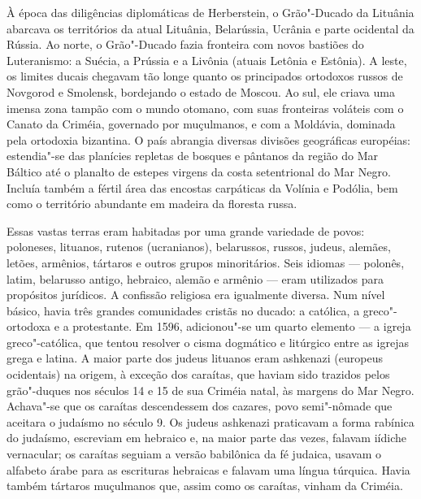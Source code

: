 À época das diligências diplomáticas de Herberstein, o Grão"-Ducado da
Lituânia abarcava os territórios da atual Lituânia, Belarússia, Ucrânia
e parte ocidental da Rússia. Ao norte, o Grão"-Ducado fazia fronteira com
novos bastiões do Luteranismo: a Suécia, a Prússia e a Livônia (atuais
Letônia e Estônia). A leste, os limites ducais chegavam tão longe quanto
os principados ortodoxos russos de Novgorod e Smolensk, bordejando o
estado de Moscou. Ao sul, ele criava uma imensa zona tampão com o mundo
otomano, com suas fronteiras voláteis com o Canato da Criméia, governado
por muçulmanos, e com a Moldávia, dominada pela ortodoxia bizantina. O
país abrangia diversas divisões geográficas européias: estendia"-se das
planícies repletas de bosques e pântanos da região do Mar Báltico até o
planalto de estepes virgens da costa setentrional do Mar Negro. Incluía
também a fértil área das encostas carpáticas da Volínia e Podólia, bem
como o território abundante em madeira da floresta russa.

Essas vastas terras eram habitadas por uma grande variedade de povos:
poloneses, lituanos, rutenos (ucranianos), belarussos, russos, judeus,
alemães, letões, armênios, tártaros e outros grupos minoritários. Seis
idiomas --- polonês, latim, belarusso antigo, hebraico, alemão e armênio ---
eram utilizados para propósitos jurídicos. A confissão religiosa era
igualmente diversa. Num nível básico, havia três grandes comunidades
cristãs no ducado: a católica, a greco"-ortodoxa e a protestante. Em
1596, adicionou"-se um quarto elemento --- a igreja greco"-católica, que
tentou resolver o cisma dogmático e litúrgico entre as igrejas grega e
latina. A maior parte dos judeus lituanos eram ashkenazi (europeus
ocidentais) na origem, à exceção dos caraítas, que haviam sido trazidos
pelos grão"-duques nos séculos 14 e 15 de sua Criméia natal, às margens
do Mar Negro. Achava"-se que os caraítas descendessem dos cazares, povo
semi"-nômade que aceitara o judaísmo no século 9. Os judeus ashkenazi
praticavam a forma rabínica do judaísmo, escreviam em hebraico e, na
maior parte das vezes, falavam iídiche vernacular; os caraítas seguiam a
versão babilônica da fé judaica, usavam o alfabeto árabe para as
escrituras hebraicas e falavam uma língua túrquica. Havia também
tártaros muçulmanos que, assim como os caraítas, vinham da Criméia.


